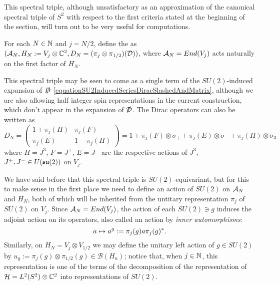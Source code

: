         
    
        

This spectral triple, although unsatisfactory as an approximation of the canonical spectral triple of $S^2$ with respect to the first criteria stated at the beginning of the section, will turn out to be very useful for computations.

\begin{definition}
For each $N \in \mathbb{N}$ and $j = N/2$, define the  as $(\mathcal A_N, \textcolor{black}{H_N} := V_j \otimes \mathbb{C}^2, D_N = (\pi_j \otimes \pi_{1/2})(\mathcal D))$, where $\mathcal A_N = End(V_j)$ acts naturally on the first factor of $H_N$.
\end{definition}

This spectral triple may be seen to come as a single term of the $SU(2)$-induced expansion of $\slashed D$ \eqref{equationSU2InducedSeriesDiracSlashedAndMatrix}, although we are also allowing  half integer spin representations in the current construction, which don't appear in the expansion of $\slashed {\mathcal D}$. The Dirac operators can also be written as
\begin{equation}
    D_N = \begin{pmatrix} 1 + \pi_j(H) & \pi_j(F) \\ \pi_j(E) & 1 - \pi_j(H)\end{pmatrix} 
    = 1 + \pi_j(F) \otimes \sigma_+ + \pi_j(E) \otimes \sigma_- + \pi_j(H) \otimes \sigma_3
\end{equation}
where $H = J^3$, $F = J^+$, $E = J^-$ are the respective actions of $J^3$, $J^+, J^- \in U(\mathfrak{su}(2))$ on $V_j$.

We have said before that this spectral triple is $SU(2)$-equivariant, but for this to make sense in the first place we need to define an action of $SU(2)$ on $\mathcal A_N$ and $H_N$, both of which will be inherited from the untitary representation $\pi_j$ of $SU(2)$ on $V_j$. Since $\mathcal A_N = End(V_j)$, the action of each $SU(2) \ni g$ induces the adjoint action on its operators, also called an action by \emph{inner automorphisms}:
\begin{equation}
    a \mapsto \textcolor{black}{a^g} := \pi_j(g) a \pi_j(g)^*.
\end{equation} 
Similarly, on $H_N = V_j \otimes V_{1/2}$ we may define the unitary left action of $g \in SU(2)$ by $u_g := \pi_j(g) \otimes \pi_{1/2}(g) \in \mathcal B(H_n)$; notice that, when $j \in \mathbb{N}$, this representation is one of the terms of the decomposition of the representation of $\mathcal H = L^2(S^2) \otimes \mathbb{C}^2$ into representations of $SU(2)$.

